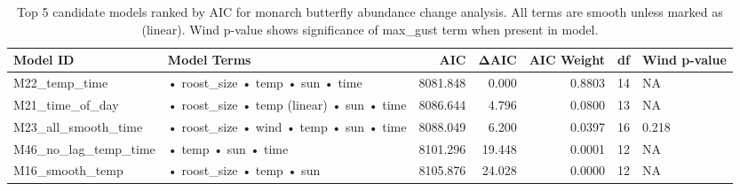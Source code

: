 \begin{table}

\caption{Top 5 candidate models ranked by AIC for monarch butterfly abundance change analysis. All terms are smooth unless marked as (linear). Wind p-value shows significance of max_gust term when present in model.}
\centering
\begin{tabular}[t]{llrrrrl}
\toprule
Model ID & Model Terms & AIC & ΔAIC & AIC Weight & df & Wind p-value\\
\midrule
M22\_temp\_time & • roost\_size
• temp
• sun
• time & 8081.848 & 0.000 & 0.8803 & 14 & NA\\
M21\_time\_of\_day & • roost\_size
• temp (linear)
• sun
• time & 8086.644 & 4.796 & 0.0800 & 13 & NA\\
M23\_all\_smooth\_time & • roost\_size
• wind
• temp
• sun
• time & 8088.049 & 6.200 & 0.0397 & 16 & 0.218\\
M46\_no\_lag\_temp\_time & • temp
• sun
• time & 8101.296 & 19.448 & 0.0001 & 12 & NA\\
M16\_smooth\_temp & • roost\_size
• temp
• sun & 8105.876 & 24.028 & 0.0000 & 12 & NA\\
\bottomrule
\end{tabular}
\end{table}
